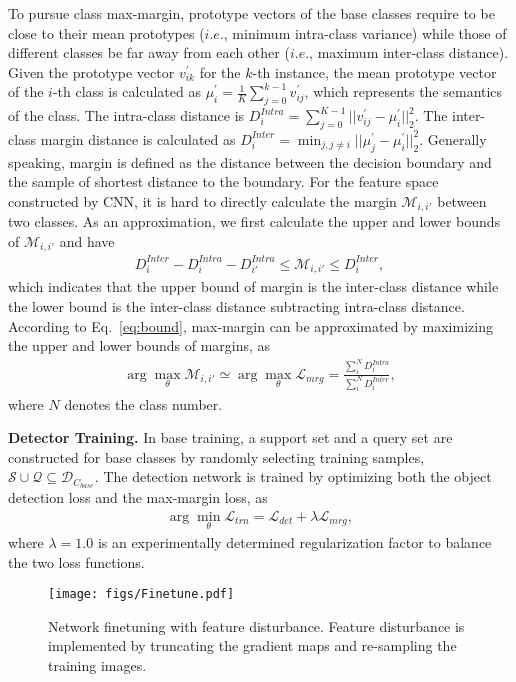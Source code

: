 \documentclass[final]{cvpr}
\begin{document}
To pursue class max-margin, prototype vectors of the base classes require to be close to their mean prototypes ($i.e.$, minimum intra-class variance) while those of different classes be far away from each other ($i.e.$, maximum inter-class distance). Given the prototype vector $v_{ik}^{'}$ for the $k$-th instance, the mean prototype vector of the $i$-th class is calculated as $\mu_i^{'} =\frac{1}{K} \sum_{j=0}^{k-1} v_{ij}^{'}$, which represents the semantics of the class. The intra-class distance is $D_{i}^{Intra} =\sum_{j=0}^{K-1} ||v_{ij}^{'}-\mu_i^{'}||_2^2$. The inter-class margin distance is calculated as  $D_{i}^{Inter} =\min_{j,j\neq i}||\mu_j^{'}-\mu_i^{'}||_2^2$. Generally speaking, margin is defined as the distance between the decision boundary and the sample of shortest distance to the boundary. For the feature space constructed by CNN, it is hard to directly calculate the margin $\mathcal{M}_{i,i'}$ between two classes. As an approximation, we first calculate the upper and lower bounds of $\mathcal{M}_{i,i'}$ and have
\begin{align}
D_i^{Inter}-D_i^{Intra}-D_{i'}^{Intra}\le \mathcal{M}_{i,{i'}} \le D_i^{Inter},
\label{eq:bound}
\end{align}
which indicates that the upper bound of margin is the inter-class distance while the lower bound is the inter-class distance subtracting intra-class distance. According to Eq.~\ref{eq:bound}, max-margin can be approximated by maximizing the upper and lower bounds of margins, as
\begin{align}
   \arg\max_\theta \mathcal{M}_{i,i'} \simeq\arg\max_\theta  \mathcal{L}_{mrg} = \frac{\sum_i^{N} D_{i}^{Intra}}{\sum_i^{N} D_{i}^{Inter}},
   \label{eq:margin_loss}
\end{align}
where $N$ denotes the class number.

\textbf{Detector Training.}
In base training, a support set and a query set are constructed for base classes by randomly selecting training samples, $\mathcal{S}\cup\mathcal{Q} \subseteq  \mathcal{D}_{C_{base}}$. The detection network is trained by optimizing both the object detection loss and the max-margin loss, as
\begin{align}
   \arg\min_{\theta} \mathcal{L}_{trn} = \mathcal{L}_{det} + \lambda \mathcal{L}_{mrg} \label{eq:loss_train},
\end{align}
where $\lambda=1.0$ is an experimentally determined regularization factor to balance the two loss functions.

\begin{figure}[t]
\centering
\texttt{[image: figs/Finetune.pdf]}
\caption{Network finetuning with feature disturbance. Feature disturbance is implemented by truncating the gradient maps and re-sampling the training images.}
\label{fig:flowchart_finetune}
\end{figure}
\end{document}
